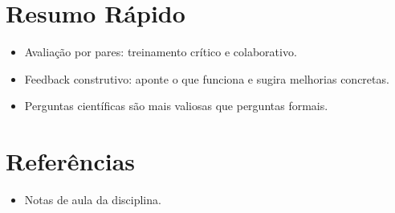 \documentclass[12pt,a4paper]{article}
\begin{document}
\section*{Resumo R\'apido}
\begin{itemize}
  \item Avalia\c{c}\~ao por pares: treinamento cr\'itico e colaborativo.
  \item Feedback construtivo: aponte o que funciona e sugira melhorias concretas.
  \item Perguntas cient\'ificas s\~ao mais valiosas que perguntas formais.
\end{itemize}

\section*{Refer\^encias}
\begin{itemize}
  \item Notas de aula da disciplina.
\end{itemize}
\end{document}
